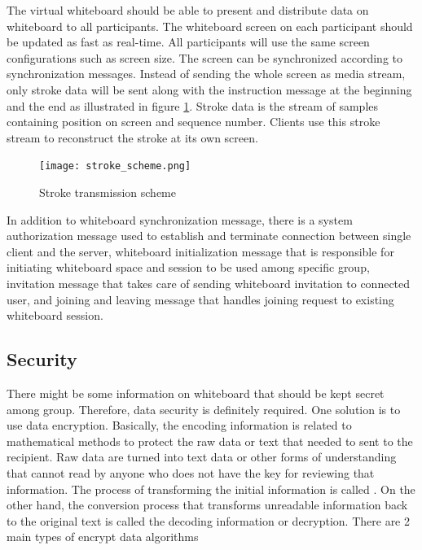 \documentclass[conference]{IEEEtran}
\begin{document}
The virtual whiteboard should be able to present and distribute data on whiteboard to all participants. 
The whiteboard screen on each participant should be updated as fast as real-time. 
All participants will use the same screen configurations such as screen size. 
The screen can be synchronized according to synchronization messages. 
Instead of sending the whole screen as media stream, only stroke data will be sent along with the instruction message at the beginning and the end as illustrated in figure \ref{fig:2}. 
Stroke data is the stream of samples containing position on screen and sequence number. 
Clients use this stroke stream to reconstruct the stroke at its own screen. 

\begin{figure}[h]
\begin{center}
\texttt{[image: stroke\_scheme.png]}
\caption{Stroke transmission scheme}
\label{fig:2}
\end{center}
\end{figure}

In addition to whiteboard synchronization message, there is a system authorization message used to establish and terminate connection between single client and the server, whiteboard initialization message that is responsible for initiating whiteboard space and session to be used among specific group, invitation message that takes care of sending whiteboard invitation to connected user, and joining and leaving message that handles joining request to existing whiteboard session.

\subsection{Security}

There might be some information on whiteboard that should be kept secret among group. 
Therefore, data security is definitely required. 
One solution is to use data encryption.
Basically, the encoding information is related to mathematical methods to protect the raw data or text that needed to sent to the recipient. 
Raw data are turned into text data or other forms of understanding that cannot read by anyone who does not have the key for reviewing that information. 
The process of transforming the initial information is called . 
On the other hand, the conversion process that transforms unreadable information back to the original text is called the decoding information or decryption. There are 2 main types of encrypt data algorithms
\end{document}
